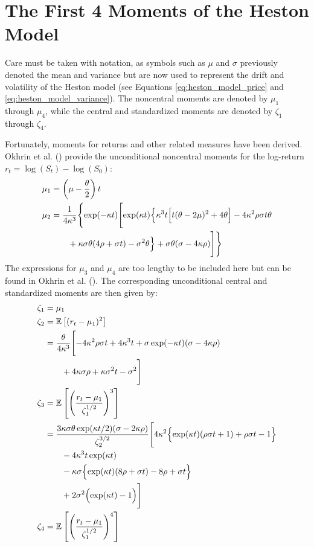 \section{The First 4 Moments of the Heston Model}

Care must be taken with notation, as symbols such as $\mu$ and $\sigma$ previously denoted the mean and variance but are now used to represent the drift and volatility of the Heston model (see Equations \eqref{eq:heston_model_price} and \eqref{eq:heston_model_variance}). The noncentral moments are denoted by $\mu_1$ through $\mu_4$, while the central and standardized moments are denoted by $\zeta_1$ through $\zeta_4$.

Fortunately, moments for returns and other related measures have been derived. Okhrin et al. (\citeyear{okhrinSimulatingCoxIngersoll2022}) provide the unconditional noncentral moments for the log-return $r_t = \log(S_t) - \log(S_0)$:
\begin{align}
    \mu_1 &= \left(\mu - \frac{\theta}{2}\right)t \notag \\
    \mu_2 &= \frac{1}{4\kappa^3}\Biggl\{
        \exp(-\kappa t)\Biggl[
            \exp(\kappa t)\Bigl\{
                \kappa^3 t\Bigl[t(\theta-2\mu)^2 + 4\theta\Bigr] 
                - 4\kappa^2\rho\sigma t\theta \notag \\
            &\quad\quad + \kappa\sigma\theta(4\rho + \sigma t)
                - \sigma^2\theta
            \Bigr\} + \sigma\theta(\sigma-4\kappa\rho)
        \Biggr]
    \Biggr\} \notag
\end{align}
The expressions for $\mu_3$ and $\mu_4$ are too lengthy to be included here but can be found in Okhrin et al. (\citeyear{okhrinSimulatingCoxIngersoll2022}). The corresponding unconditional central and standardized moments are then given by:
\begin{align}
    \zeta_1 &= \mu_1 \notag \\
    \zeta_2 &= \mathbb{E}\left[(r_t-\mu_1)^2\right] \notag \\
    &=\frac{\theta}{4\kappa^3}\Biggl[
        -4\kappa^2\rho\sigma t + 4\kappa^3 t + \sigma\exp(-\kappa t)(\sigma - 4\kappa\rho) \notag\\
    &\quad\quad + 4\kappa\sigma\rho + \kappa\sigma^2 t - \sigma^2
    \Biggr] \notag \\
    \zeta_3 &= \mathbb{E}\left[\left(\frac{r_t-\mu_1}{\zeta_1^{1/2}}\right)^3\right] \notag \\
    &=\frac{3\kappa\sigma\theta\exp(\kappa t/2)(\sigma - 2\kappa\rho)}{\zeta_2^{3/2}}
    \Biggl[
        4\kappa^2\Bigl\{\exp(\kappa t)(\rho\sigma t+1) + \rho\sigma t - 1\Bigr\} \notag\\
    &\quad\quad - 4\kappa^3 t\exp(\kappa t) \notag\\
    &\quad\quad - \kappa\sigma\Bigl\{\exp(\kappa t)(8\rho + \sigma t) - 8\rho + \sigma t\Bigr\} \notag\\
    &\quad\quad + 2\sigma^2\Bigl(\exp(\kappa t)-1\Bigr)
    \Biggr] \notag \\
    \zeta_4 &= \mathbb{E}\left[\left(\frac{r_t-\mu_1}{\zeta_1^{1/2}}\right)^4\right] \notag
\end{align}
